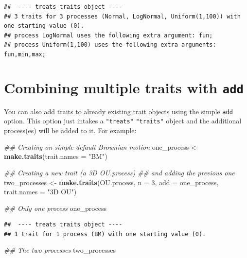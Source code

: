 \documentclass[
]{book}
\newenvironment{Shaded}{\begin{snugshade}}{\end{snugshade}}
\newcommand{\CommentTok}[1]{\textcolor[rgb]{0.56,0.35,0.01}{\textit{#1}}}
\newcommand{\DataTypeTok}[1]{\textcolor[rgb]{0.13,0.29,0.53}{#1}}
\newcommand{\DecValTok}[1]{\textcolor[rgb]{0.00,0.00,0.81}{#1}}
\newcommand{\KeywordTok}[1]{\textcolor[rgb]{0.13,0.29,0.53}{\textbf{#1}}}
\newcommand{\NormalTok}[1]{#1}
\newcommand{\StringTok}[1]{\textcolor[rgb]{0.31,0.60,0.02}{#1}}
\begin{document}
\begin{verbatim}
##  ---- treats traits object ---- 
## 3 traits for 3 processes (Normal, LogNormal, Uniform(1,100)) with one starting value (0).
## process LogNormal uses the following extra argument: fun;
## process Uniform(1,100) uses the following extra arguments: fun,min,max;
\end{verbatim}

\hypertarget{combining-multiple-traits-with-add}{%
\section{\texorpdfstring{Combining multiple traits with \texttt{add}}{Combining multiple traits with add}}\label{combining-multiple-traits-with-add}}

You can also add traits to already existing trait objects using the simple \texttt{add} option.
This option just intakes a \texttt{"treats"} \texttt{"traits"} object and the additional process(es) will be added to it. For example:

\begin{Shaded}
\begin{Highlighting}[]
\CommentTok{\#\# Creating on simple default Brownian motion}
\NormalTok{one\_process \textless{}{-}}\StringTok{ }\KeywordTok{make.traits}\NormalTok{(}\DataTypeTok{trait.names =} \StringTok{"BM"}\NormalTok{)}

\CommentTok{\#\# Creating a new trait (a 3D OU.process)}
\CommentTok{\#\# and adding the previous one}
\NormalTok{two\_processes \textless{}{-}}\StringTok{ }\KeywordTok{make.traits}\NormalTok{(OU.process, }\DataTypeTok{n =} \DecValTok{3}\NormalTok{, }\DataTypeTok{add =}\NormalTok{ one\_process,}
                             \DataTypeTok{trait.names =} \StringTok{"3D OU"}\NormalTok{)}

\CommentTok{\#\# Only one process}
\NormalTok{one\_process}
\end{Highlighting}
\end{Shaded}

\begin{verbatim}
##  ---- treats traits object ---- 
## 1 trait for 1 process (BM) with one starting value (0).
\end{verbatim}

\begin{Shaded}
\begin{Highlighting}[]
\CommentTok{\#\# The two processes}
\NormalTok{two\_processes}
\end{Highlighting}
\end{Shaded}
\end{document}
